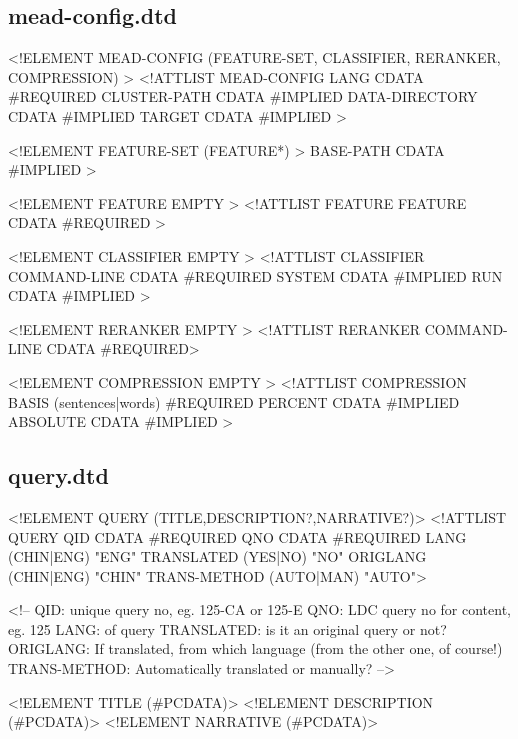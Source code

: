 \documentclass[10pt]{article}
\begin{document}
\subsection{mead-config.dtd}
\begin{center}
\begin{boxedverbatim}
<!ELEMENT MEAD-CONFIG (FEATURE-SET, CLASSIFIER, RERANKER,
COMPRESSION) >
<!ATTLIST MEAD-CONFIG
   LANG CDATA #REQUIRED
   CLUSTER-PATH CDATA #IMPLIED
   DATA-DIRECTORY CDATA #IMPLIED
   TARGET CDATA #IMPLIED >

<!ELEMENT FEATURE-SET (FEATURE*) >
   BASE-PATH CDATA #IMPLIED >

<!ELEMENT FEATURE EMPTY >
<!ATTLIST FEATURE
   FEATURE CDATA #REQUIRED >

<!ELEMENT CLASSIFIER EMPTY >
<!ATTLIST CLASSIFIER
   COMMAND-LINE CDATA #REQUIRED
   SYSTEM CDATA #IMPLIED
   RUN CDATA #IMPLIED >

<!ELEMENT RERANKER EMPTY >
<!ATTLIST RERANKER
   COMMAND-LINE CDATA #REQUIRED>

<!ELEMENT COMPRESSION EMPTY >
<!ATTLIST COMPRESSION
   BASIS (sentences|words) #REQUIRED
   PERCENT CDATA #IMPLIED
   ABSOLUTE CDATA #IMPLIED >
\end{boxedverbatim}
\end{center}


\subsection{query.dtd}
\begin{center}
\begin{boxedverbatim}
<!ELEMENT QUERY (TITLE,DESCRIPTION?,NARRATIVE?)>
<!ATTLIST QUERY
   QID  CDATA #REQUIRED
   QNO  CDATA #REQUIRED
   LANG (CHIN|ENG) "ENG"
   TRANSLATED (YES|NO) "NO"
   ORIGLANG (CHIN|ENG) "CHIN"
   TRANS-METHOD (AUTO|MAN) "AUTO">

<!-- QID: unique query no, eg. 125-CA or 125-E
     QNO: LDC query no for content, eg. 125
     LANG: of query
     TRANSLATED: is it an original query or not?
     ORIGLANG: If translated, from which language (from the other
     one, of course!)
     TRANS-METHOD: Automatically translated or manually? -->

<!ELEMENT TITLE       (#PCDATA)>
<!ELEMENT DESCRIPTION (#PCDATA)>
<!ELEMENT NARRATIVE   (#PCDATA)>
\end{boxedverbatim}
\end{center}
\end{document}
